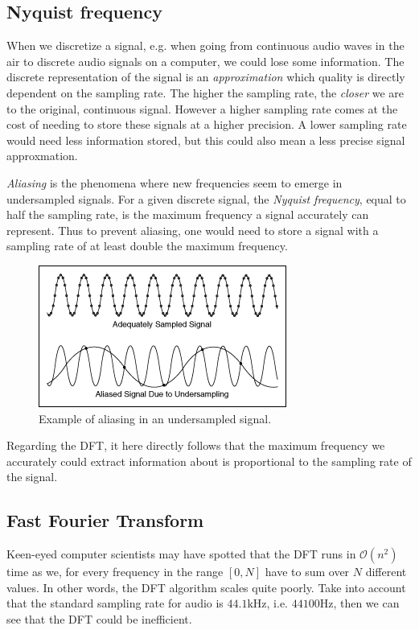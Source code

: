 \subsection{Nyquist frequency}

When we discretize a signal, e.g. when going from continuous audio waves in the air to discrete audio signals on a computer, we could lose some information. The discrete representation of the signal is an \textit{approximation} which quality is directly dependent on the sampling rate. The higher the sampling rate, the \textit{closer} we are to the original, continuous signal. However a higher sampling rate comes at the cost of needing to store these signals at a higher precision. A lower sampling rate would need less information stored, but this could also mean a less precise signal approxmation.

\textit{Aliasing} is the phenomena where new frequencies seem to emerge in undersampled signals. For a given discrete signal, the \textit{Nyquist frequency}, equal to half the sampling rate, is the maximum frequency a signal accurately can represent. Thus to prevent aliasing, one would need to store a signal with a sampling rate of at least double the maximum frequency.

\begin{figure}[H]
    \centering
    \includegraphics[scale=2.0]{figures/signalaliasing.png}
    \caption{Example of aliasing in an undersampled signal.}
    \label{AliasingFigure}
\end{figure}

Regarding the \gls{DFT}, it here directly follows that the maximum frequency we accurately could extract information about is proportional to the sampling rate of the signal.

\subsection{Fast Fourier Transform}

Keen-eyed computer scientists may have spotted that the \gls{DFT} runs in $\mathcal{O}(n^2)$ time as we, for every frequency in the range $[0, N]$ have to sum over $N$ different values. In other words, the \gls{DFT} algorithm scales quite poorly. Take into account that the standard sampling rate for audio is $44.1 \text{kHz}$, i.e. $44100 \text{Hz}$, then we can see that the \gls{DFT} could be inefficient.~\cite{pras2010sampling}

